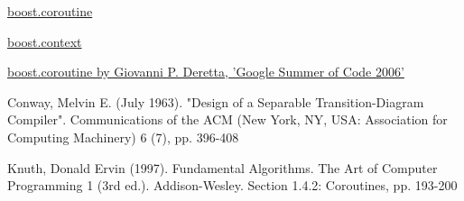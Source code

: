 \begin{thebibliography}{99}

        \href{http://www.boost.org/doc/libs/1_53_0/libs/coroutine/doc/html/index.html}
        {boost.coroutine}

        \href{http://www.boost.org/doc/libs/1_53_0/libs/context/doc/html/index.html}
        {boost.context}

        \href{http://www.crystalclearsoftware.com/soc/coroutine/}
        {boost.coroutine by Giovanni P. Deretta, 'Google Summer of Code 2006'}

        {Conway, Melvin E. (July 1963). "Design of a Separable
        Transition-Diagram Compiler". Communications of the ACM (New York, NY,
        USA: Association for Computing Machinery) 6 (7), pp. 396-408}

        {Knuth, Donald Ervin (1997). Fundamental Algorithms. The Art of Computer
        Programming 1 (3rd ed.). Addison-Wesley. Section 1.4.2: Coroutines, pp.
        193-200}

\end{thebibliography}

